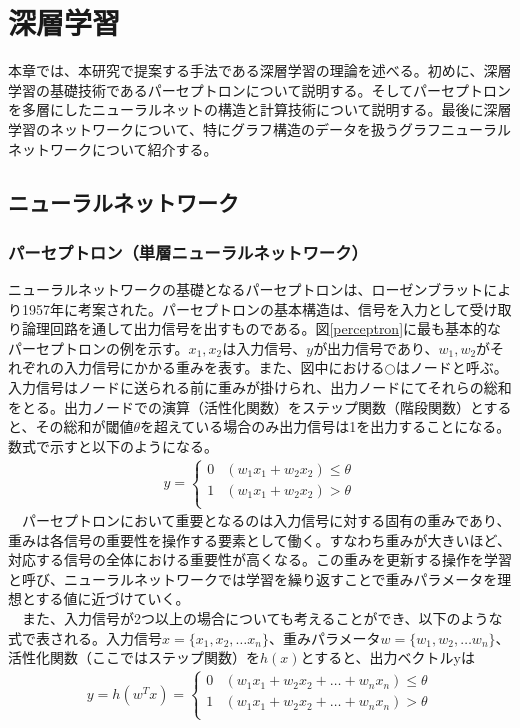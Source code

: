 
\chapter{深層学習} \label{sec:Deeplearning}
本章では、本研究で提案する手法である深層学習の理論を述べる。初めに、深層学習の基礎技術であるパーセプトロンについて説明する。そしてパーセプトロンを多層にしたニューラルネットの構造と計算技術について説明する。最後に深層学習のネットワークについて、特にグラフ構造のデータを扱うグラフニューラルネットワークについて紹介する。
\section{ニューラルネットワーク}
\subsection{パーセプトロン（単層ニューラルネットワーク）}
ニューラルネットワークの基礎となるパーセプトロンは、ローゼンブラットにより1957年に考案された。パーセプトロンの基本構造は、信号を入力として受け取り論理回路を通して出力信号を出すものである。図\ref{perceptron}に最も基本的なパーセプトロンの例を示す。$x_1, x_2$は入力信号、$y$が出力信号であり、$w_1,w_2$がそれぞれの入力信号にかかる重みを表す。また、図中における$\bigcirc$はノードと呼ぶ。入力信号はノードに送られる前に重みが掛けられ、出力ノードにてそれらの総和をとる。出力ノードでの演算（活性化関数）をステップ関数（階段関数）とすると、その総和が閾値$\theta$を超えている場合のみ出力信号は1を出力することになる。数式で示すと以下のようになる。\\
\begin{align}
 y =
 \begin{cases}
 0 & (w_1x_1 + w_2x_2 ) \leq \theta\\
 1 & (w_1x_1 + w_2x_2 ) > \theta \\
 \end{cases}
\end{align}
　パーセプトロンにおいて重要となるのは入力信号に対する固有の重みであり、重みは各信号の重要性を操作する要素として働く。すなわち重みが大きいほど、対応する信号の全体における重要性が高くなる。この重みを更新する操作を学習と呼び、ニューラルネットワークでは学習を繰り返すことで重みパラメータを理想とする値に近づけていく。\\
　また、入力信号が2つ以上の場合についても考えることができ、以下のような式で表される。入力信号$x = \{ x_1, x_2, \ldots x_n \}$、重みパラメータ$w = \{ w_1, w_2, \ldots w_n \}$、活性化関数（ここではステップ関数）を$h(x)$とすると、出力ベクトルyは
\begin{align}
y = h(w^T x) =
 \begin{cases}
 0 & (w_1x_1 + w_2x_2 + \ldots + w_nx_n) \leq \theta\\
 1 & (w_1x_1 + w_2x_2 + \ldots + w_nx_n) > \theta \\
 \end{cases}
\end{align}
